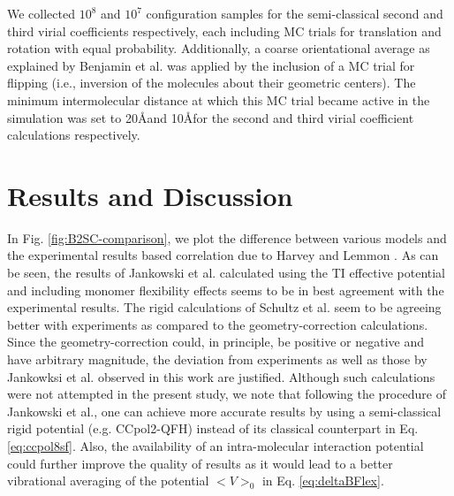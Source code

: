         We collected $10^8$ and $10^7$ configuration samples for the semi-classical second and third virial coefficients respectively, each including MC trials for translation and rotation with equal probability. Additionally, a coarse orientational average as explained by Benjamin et al. \cite{Benjamin2009} was applied by the inclusion of a MC trial for flipping (i.e., inversion of the molecules about their geometric centers). The minimum intermolecular distance at which this MC trial became active in the simulation was set to 20\AA and 10\AA for the second and third virial coefficient calculations respectively.

\section{Results and Discussion}
    \label{sec:results}
        In Fig. \ref{fig:B2SC-comparison}, we plot the difference between various models and the experimental results based correlation due to Harvey and Lemmon \cite{Harvey2004}. As can be seen, the results of Jankowski et al. \cite{Jankowski2015} calculated using the TI effective potential and including monomer flexibility effects seems to be in best agreement with the experimental results. The rigid calculations of Schultz et al. \cite{Schultz2015} seem to be agreeing better with experiments as compared to the geometry-correction calculations. Since the geometry-correction could, in principle, be positive or negative and have arbitrary magnitude, the deviation from experiments as well as those by Jankowksi et al.\cite{Jankowski2015} observed in this work are justified. Although such calculations were not attempted in the present study, we note that following the procedure of Jankowski et al.\cite{Jankowski2015}, one can achieve more accurate results by using a semi-classical rigid potential (e.g. CCpol2-QFH) instead of its classical counterpart in Eq. \eqref{eq:ccpol8sf}. Also, the availability of an intra-molecular interaction potential could further improve the quality of results as it would lead to a better vibrational averaging of the potential $<V>_0$ in Eq. \eqref{eq:deltaBFlex}.
